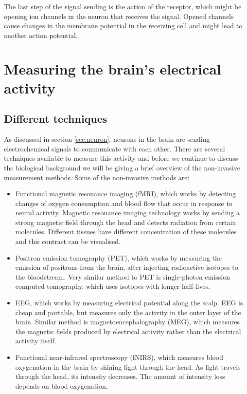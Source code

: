 The last step of the signal sending is the action of the receptor, which might be opening ion channels in the neuron that receives the signal. Opened channels cause changes in the membrane potential in the receiving cell and might lead to another action potential.

\section{Measuring the brain's electrical activity}
\subsection{Different techniques}

As discussed in section \ref{sec:neuron}, neurons in the brain are sending electrochemical signals to communicate with each other. There are several techniques available to measure this activity and before we continue to discuss the biological background we will be giving a brief overview of the non-invasive measurement methods. Some of the non-invasive methods are:
\begin{itemize}
	\item Functional magnetic resonance imaging (fMRI), which works by detecting changes of oxygen consumption and blood flow that occur in response to neural activity. Magnetic resonance imaging technology works by sending a strong magnetic field through the head and detects radiation from certain molecules. Different tissues have different concentration of these molecules and this contrast can be visualised.
	\item Positron emission tomography (PET), which works by measuring the emission of positrons from the brain, after injecting radioactive isotopes to the bloodstream. Very similar method to PET is single-photon emission computed tomography, which uses isotopes with longer half-lives.
	\item \acrfull{EEG}, which works by measuring electrical potential along the scalp. EEG is cheap and portable, but measures only the activity in the outer layer of the brain. Similar method is magnetoencephalography (MEG), which measures the magnetic fields produced by electrical activity rather than the electrical activity itself.
	\item Functional near-infrared spectroscopy (fNIRS), which measures blood oxygenation in the brain by shining light through the head. As light travels through the head, its intensity decreases. The amount of intensity loss depends on blood oxygenation.
\end{itemize}

